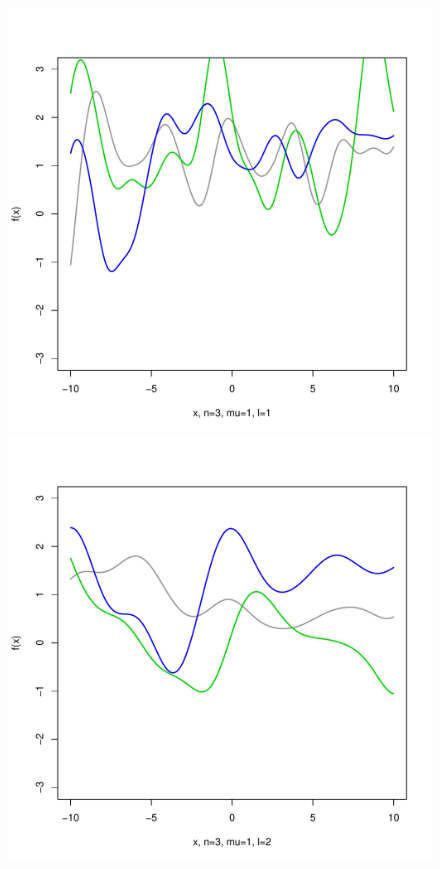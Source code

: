 \documentclass[12pt,letterpaper]{article}
\begin{document}
\begin{figure}
\begin{center}
\includegraphics[scale=0.2]{hw321/n3-m1-l1.pdf}
\includegraphics[scale=0.2]{hw321/n3-m1-l2.pdf}

\end{center}
\end{figure}
\end{document}
